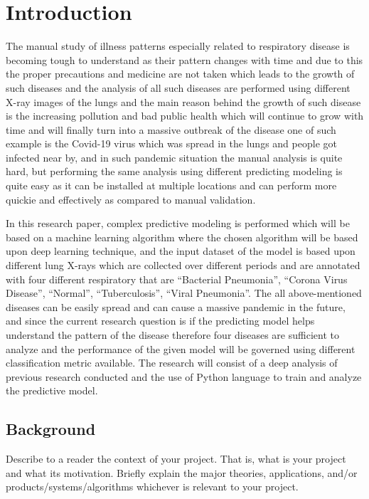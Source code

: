 \chapter{Introduction}
\label{ch:into} %

The manual study of illness patterns especially related to respiratory disease\cite{Zimlich} is becoming tough to understand as their pattern changes with time and due to this the proper precautions and medicine are not taken which leads to the growth of such diseases and the analysis of all such diseases are performed using different X-ray images of the lungs and the main reason behind the growth of such disease is the increasing pollution and bad public health which will continue to grow with time and will finally turn into a massive outbreak of the disease one of such example is the Covid-19\cite{WHO} virus  which was spread in the lungs and people got infected near by, and in such pandemic situation the manual analysis is quite hard, but performing the same analysis using different predicting modeling is quite easy as it can be installed at multiple locations and can perform more quickie and effectively as compared to manual validation. 

In this research paper, complex predictive modeling is performed which will be based on a machine learning algorithm where the chosen algorithm will be based upon deep learning technique, and the input dataset \cite{Kaggle} of the model is based upon different lung X-rays which are collected over different periods and are annotated with four different respiratory that are “Bacterial Pneumonia”, “Corona Virus Disease”, “Normal”, “Tuberculosis”, “Viral Pneumonia”. The all above-mentioned diseases can be easily spread and can cause a massive pandemic in the future, and since the current research question is if the predicting model helps understand the pattern of the disease therefore four diseases are sufficient to analyze and the performance of the given model will be governed using different classification metric \cite{JP} available. The research will consist of a deep analysis of previous research conducted and the use of Python language to train and analyze the predictive model.
\section{Background}
\label{sec:into_back}
Describe to a reader the context of your project. That is, what is your project and what its motivation. Briefly explain the major theories, applications, and/or products/systems/algorithms whichever is relevant to your project.


